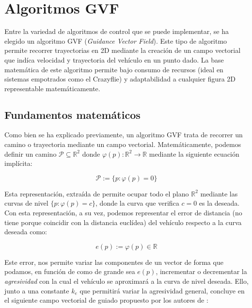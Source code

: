 \section{Algoritmos GVF}

Entre la variedad de algoritmos de control que se puede implementar, 
se ha elegido un algoritmo GVF (\textit{Guidance Vector Field}).
Este tipo de algoritmo permite recorrer trayectorias en 2D
mediante la creación de un campo vectorial que indíca velocidad y trayectoria 
del vehículo en un punto dado. 
La base matemática de este algoritmo permite bajo consumo de recursos 
(ideal en sistemas empotrados como el Crazyflie) y adaptabilidad a cualquier figura 2D representable matemáticamente.


\subsection{Fundamentos matemáticos}

Como bien se ha explicado previamente, un algoritmo GVF trata de recorrer 
un camino o trayectoria mediante un campo vectorial. 
Matemáticamente, podemos definir un camino $\mathcal{P} \subseteq \mathds{R}^2$
donde $\varphi(p) : \mathds{R}^2 \rightarrow \mathds{R}$
mediante la siguiente ecuación implícita:

\begin{equation}
    \mathcal{P} := \{ p : \varphi(p) = 0\}
\end{equation}

Esta representación, extraída de \cite{gvf-hector} permite ocupar todo el 
plano $\mathds{R}^2$ mediante las curvas de nivel $\{ p : \varphi(p) = c\}$, 
donde la curva que verifica $c = 0$ es la deseada. Con esta representación, a su vez, 
podemos representar el error de distancia (no tiene porque coincidir con la distancia euclídea)
del vehículo respecto a la curva deseada como:

\begin{equation}
    e(p) := \varphi(p) \in \mathds{R}
\end{equation}

Este error, nos permite variar las componentes de un vector de forma que podamos, 
en función de como de grande sea $e(p)$, incrementar o decrementar la \textit{agresividad} 
con la cual el vehículo se aproximará a la curva de nivel deseada. 
Ello, junto a una constante $k_e$ que permitirá variar la agresividad general, concluye 
en el siguiente campo vectorial de guiado propuesto por los autores de \cite{gvf-hector}:

